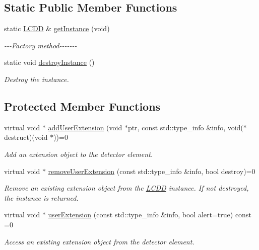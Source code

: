 \subsection*{Static Public Member Functions}
\begin{DoxyCompactItemize}
\item 
static \hyperlink{class_d_d4hep_1_1_geometry_1_1_l_c_d_d}{LCDD} \& \hyperlink{class_d_d4hep_1_1_geometry_1_1_l_c_d_d_a4ba28eb0e53e15856d7a773c4ff758b9}{getInstance} (void)
\begin{DoxyCompactList}\small\item\em -\/-\/-\/Factory method-\/-\/-\/-\/-\/-\/-\/ \item\end{DoxyCompactList}\item 
static void \hyperlink{class_d_d4hep_1_1_geometry_1_1_l_c_d_d_a7470fc11102bacc2b486590de49a8017}{destroyInstance} ()
\begin{DoxyCompactList}\small\item\em Destroy the instance. \item\end{DoxyCompactList}\end{DoxyCompactItemize}
\subsection*{Protected Member Functions}
\begin{DoxyCompactItemize}
\item 
virtual void $\ast$ \hyperlink{class_d_d4hep_1_1_geometry_1_1_l_c_d_d_ae4fdea118902519ae7581fe0bd733559}{addUserExtension} (void $\ast$ptr, const std::type\_\-info \&info, void($\ast$destruct)(void $\ast$))=0
\begin{DoxyCompactList}\small\item\em Add an extension object to the detector element. \item\end{DoxyCompactList}\item 
virtual void $\ast$ \hyperlink{class_d_d4hep_1_1_geometry_1_1_l_c_d_d_a05c121b360d248ce34a2d9337df9f49b}{removeUserExtension} (const std::type\_\-info \&info, bool destroy)=0
\begin{DoxyCompactList}\small\item\em Remove an existing extension object from the \hyperlink{class_d_d4hep_1_1_geometry_1_1_l_c_d_d}{LCDD} instance. If not destroyed, the instance is returned. \item\end{DoxyCompactList}\item 
virtual void $\ast$ \hyperlink{class_d_d4hep_1_1_geometry_1_1_l_c_d_d_a699d446afe8b33487cdce57d4e2f26c6}{userExtension} (const std::type\_\-info \&info, bool alert=true) const =0
\begin{DoxyCompactList}\small\item\em Access an existing extension object from the detector element. \item\end{DoxyCompactList}\end{DoxyCompactItemize}
